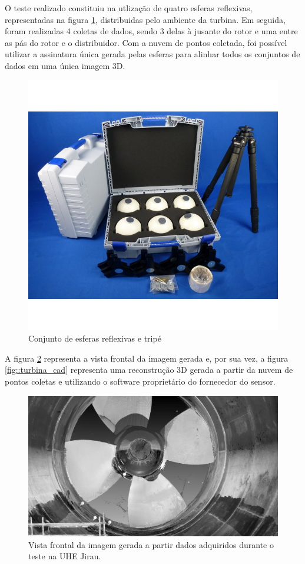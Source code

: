 O teste realizado constituiu na utlização de quatro esferas reflexivas,
representadas na figura \ref{fig::esferas}, distribuidas pelo ambiente da
turbina.
Em seguida, foram realizadas 4 coletas de dados, sendo 3 delas à jusante do
rotor e uma entre as pás do rotor e o distribuidor. Com a nuvem de pontos
coletada, foi possível utilizar a assinatura única gera\-da pelas esferas para
alinhar todos os conjuntos de dados em uma única imagem 3D.

\begin{figure}[h!]
\centering
	\includegraphics[width=0.7\columnwidth]{detail/figs/3dsensors/kit}
	\caption{Conjunto de esferas reflexivas e tripé}
	\label{fig::esferas}
\end{figure}

A figura \ref{fig::turbina_faro} representa a vista frontal da imagem gerada e, por sua
vez, a figura \ref{fig::turbina_cad} representa uma reconstrução 3D gerada a
partir da nuvem de pontos coletas e utilizando o software proprietário do
fornecedor do sensor. 

\begin{figure}[h!]
\centering
	\includegraphics[width=0.8\columnwidth]{detail/figs/3dsensors/recorte_video}
	\caption{Vista frontal da imagem gerada a partir dados adquiridos durante o
	teste na UHE Jirau.}
	\label{fig::turbina_faro}
\end{figure}

